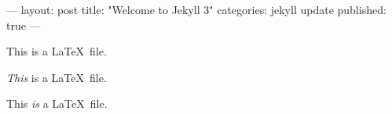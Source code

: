 ---
layout: post
title:  "Welcome to Jekyll 3"
categories: jekyll update
published: true
---

This is a \LaTeX\ file. 

\emph{This} is a \LaTeX\ file. 

This \emph{is} a \LaTeX\ file.